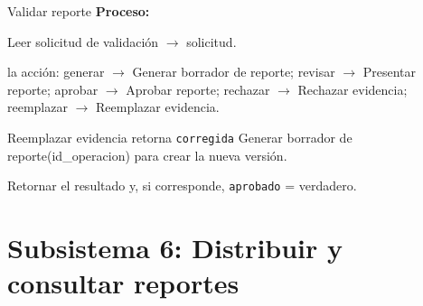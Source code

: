\begin{modspec}{Validar reporte}
\textbf{Proceso:}
\begin{logica}
    \item Leer solicitud de validación $\rightarrow$ solicitud.
    \item {} la acción: generar $\rightarrow$ Generar borrador de reporte; revisar
    $\rightarrow$ Presentar reporte; aprobar $\rightarrow$ Aprobar reporte; rechazar
    $\rightarrow$ Rechazar evidencia; reemplazar $\rightarrow$ Reemplazar evidencia.
    \item {} Reemplazar evidencia retorna \texttt{corregida}  Generar
    borrador de reporte(id\_operacion) para crear la nueva versión.
    \item Retornar el resultado y, si corresponde, \texttt{aprobado} = verdadero.
\end{logica}
\end{modspec}

\section{Subsistema 6: Distribuir y consultar reportes}

